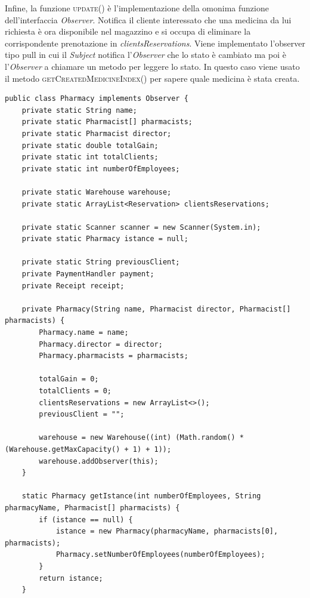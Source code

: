 \documentclass[a4paper, 10pt]{report}
\begin{document}
Infine, la funzione \textsc{update()} è l'implementazione della omonima funzione dell'interfaccia \textit{Observer}. Notifica il cliente interessato che una medicina da lui richiesta è ora disponibile nel magazzino e si occupa di eliminare la corrispondente prenotazione in \textit{clientsReservations}. Viene implementato l'observer tipo pull in cui il \textit{Subject} notifica l’\textit{Observer} che lo stato è cambiato ma poi è l’\textit{Observer} a chiamare un metodo per leggere lo stato. In questo caso viene usato il metodo \textsc{getCreatedMedicineIndex()} per sapere quale medicina è stata creata.\\
\begin{lstlisting}
public class Pharmacy implements Observer {
    private static String name;
    private static Pharmacist[] pharmacists;
    private static Pharmacist director;
    private static double totalGain;
    private static int totalClients;
    private static int numberOfEmployees;

    private static Warehouse warehouse;
    private static ArrayList<Reservation> clientsReservations;

    private static Scanner scanner = new Scanner(System.in);
    private static Pharmacy istance = null;

    private static String previousClient;
    private PaymentHandler payment;
    private Receipt receipt;

    private Pharmacy(String name, Pharmacist director, Pharmacist[] pharmacists) {
        Pharmacy.name = name;
        Pharmacy.director = director;
        Pharmacy.pharmacists = pharmacists;

        totalGain = 0;
        totalClients = 0;
        clientsReservations = new ArrayList<>();
        previousClient = "";

        warehouse = new Warehouse((int) (Math.random() * (Warehouse.getMaxCapacity() + 1) + 1));
        warehouse.addObserver(this);
    }

    static Pharmacy getIstance(int numberOfEmployees, String pharmacyName, Pharmacist[] pharmacists) {
        if (istance == null) {
            istance = new Pharmacy(pharmacyName, pharmacists[0], pharmacists);
            Pharmacy.setNumberOfEmployees(numberOfEmployees);
        }
        return istance;
    }


\end{lstlisting}
\end{document}
